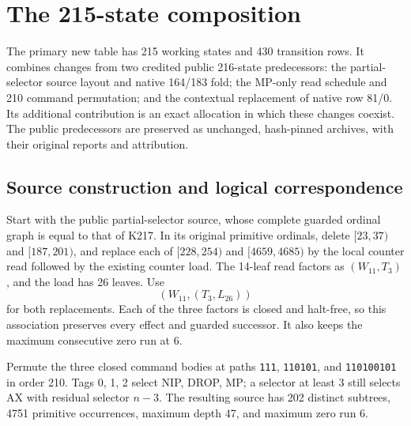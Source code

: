 \section{The 215-state composition}
\label{sec:composition215}

The primary new table has 215 working states and 430 transition rows. It combines
changes from two credited public 216-state predecessors: the partial-selector
source layout and native 164/183 fold; the MP-only read schedule and 210 command
permutation; and the contextual replacement of native row 81/0. Its additional
contribution is an exact allocation in which these changes coexist. The public
predecessors are preserved as unchanged, hash-pinned archives, with their
original reports and attribution.

\subsection{Source construction and logical correspondence}

Start with the public partial-selector source, whose complete guarded ordinal
graph is equal to that of K217. In its original primitive ordinals, delete
$[23,37)$ and $[187,201)$, and replace each of $[228,254)$ and $[4659,4685)$ by the
local counter read followed by the existing counter load. The 14-leaf read
factors as $(W_{11},T_3)$, and the load has 26 leaves. Use
\[
  (W_{11},(T_3,L_{26}))
\]
for both replacements. Each of the three factors is closed and halt-free, so
this association preserves every effect and guarded successor. It also keeps
the maximum consecutive zero run at 6.

Permute the three closed command bodies at paths
\texttt{111}, \texttt{110101}, and \texttt{110100101} in order 210. Tags 0, 1, 2 select
NIP, DROP, MP; a selector at least 3 still selects AX with residual selector $n-3$.
The resulting source has 202 distinct subtrees, 4751 primitive occurrences,
maximum depth 47, and maximum zero run 6.

